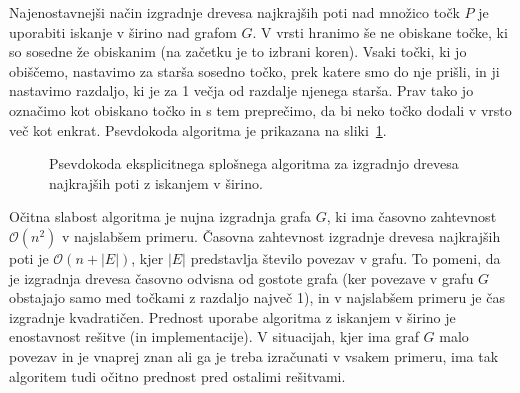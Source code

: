 \documentclass[a4paper, 12pt]{book}
\newcommand{\OO}{\ensuremath{\mathcal{O}}} %
\begin{document}
Najenostavnejši način izgradnje drevesa najkrajših poti nad množico točk $P$ je uporabiti iskanje v širino nad grafom $G$. V vrsti hranimo še ne obiskane točke, ki so sosedne že obiskanim (na začetku je to izbrani koren). Vsaki točki, ki jo obiščemo, nastavimo za starša sosedno točko, prek katere smo do nje prišli, in ji nastavimo razdaljo, ki je za 1 večja od razdalje njenega starša. Prav tako jo označimo kot obiskano točko in s tem preprečimo, da bi neko točko dodali v vrsto več kot enkrat. Psevdokoda algoritma je prikazana na sliki~\ref{fig:genericBfs}. 
\begin{figure}[htp]
\begin{center}
\end{center}
\caption{Psevdokoda eksplicitnega splošnega algoritma za izgradnjo drevesa najkrajših poti z iskanjem v širino.}
\label{fig:genericBfs}
\end{figure}
Očitna slabost algoritma je nujna izgradnja grafa $G$, ki ima časovno zahtevnost $\OO(n^2)$ v najslabšem primeru. Časovna zahtevnost izgradnje drevesa najkrajših poti je $\OO(n + |E|)$, kjer $|E|$ predstavlja število povezav v grafu. To pomeni, da je izgradnja drevesa časovno odvisna od gostote grafa (ker povezave v grafu $G$ obstajajo samo med točkami z razdaljo največ 1), in v najslabšem primeru je čas izgradnje kvadratičen. Prednost uporabe algoritma z iskanjem v širino je enostavnost rešitve (in implementacije). V situacijah, kjer ima graf $G$ malo povezav in je vnaprej znan ali ga je treba izračunati v vsakem primeru, ima tak algoritem tudi očitno prednost pred ostalimi rešitvami. 
\end{document}
